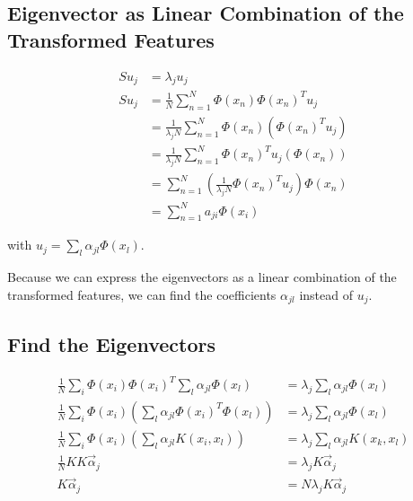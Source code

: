 \subsection{Eigenvector as Linear Combination of the Transformed Features}

\begin{align*}
	S u_j & = \lambda_j u_j                                                                   \\
	S u_j & = \frac{1}{N} \sum_{n = 1}^{N} \Phi(x_n) \Phi(x_n)^T u_j                          \\
	      & = \frac{1}{\lambda_j N} \sum_{n = 1}^{N} \Phi(x_n) (\Phi(x_n)^T u_j)              \\
	      & = \frac{1}{\lambda_j N} \sum_{n = 1}^{N} \Phi(x_n)^T u_j (\Phi(x_n))              \\
	      & = \sum_{n = 1}^{N} \left( \frac{1}{\lambda_j N} \Phi(x_n)^T u_j \right) \Phi(x_n) \\
	      & = \sum_{n = 1}^{N} a_{ji} \Phi(x_i)
\end{align*}

with \(u_j = \sum_{l} \alpha_{jl} \Phi(x_l)\).

Because we can express the eigenvectors as a linear combination of the transformed features, we can
find the coefficients \(\alpha_{jl}\) instead of \(u_j\).

\subsection{Find the Eigenvectors}

\begin{align*}
	\frac{1}{N} \sum_{i} \Phi(x_i) \Phi(x_i)^T \sum_{l} \alpha_{jl} \Phi(x_l)                & = \lambda_j \sum_{l} \alpha_{jl} \Phi(x_l)   \\
	\frac{1}{N} \sum_{i} \Phi(x_i) \left( \sum_{l} \alpha_{jl} \Phi(x_i)^T \Phi(x_l) \right) & = \lambda_j \sum_{l} \alpha_{jl} \Phi(x_l)   \\
	\frac{1}{N} \sum_{i} \Phi(x_i) \left( \sum_{l} \alpha_{jl} K(x_i, x_l) \right)           & = \lambda_j \sum_{l} \alpha_{jl} K(x_k, x_l) \\
	\frac{1}{N} KK \vec{\alpha}_j                                                            & = \lambda_j K \vec{\alpha}_j                 \\
	K \vec{\alpha}_j                                                                         & = N \lambda_j K \vec{\alpha}_j
\end{align*}

